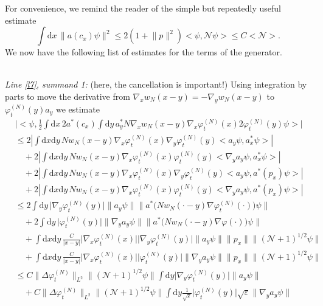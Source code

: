 \documentclass[11pt,a4paper,DIV11]{scrartcl}	%
\newcommand{\di}{\textrm{d}}		%
\newcommand{\Ncal}{\mathcal{N}}		%
\newcommand{\estlist}[2]{\emph{\vspace{.3em}\\Line \ref{l#1}, summand #2:}}
\newcommand{\scal}[2]{\big<#1,#2\big>} %
\newcommand{\norm}[1]{\lVert#1\rVert}	%
\newcommand{\ev}[1]{\big<#1\big>}	%
\newcommand{\ph}{\varphi_t^{(N)}}	%
\newcommand{\bd}{\begin{displaymath}}			%
\newcommand{\ed}{\end{displaymath}}
\begin{document}
For convenience, we remind the reader of the simple but repeatedly useful estimate
\bd
\int \di x\, \norm{a(c_x)\psi}^2 \leq 2(1+\norm{p}^2)\scal{\psi}{\Ncal\psi} \leq C\ev{\Ncal}.
\ed
We now have the following list of estimates for the terms of the generator.\newline
\begin{fleqn}[0.5em]	%
\estlist{7}{1} (here, the cancellation is important!)
Using integration by parts to move the derivative from $\nabla_x w_N(x-y) = - \nabla_y w_N(x-y)$ to $\ph(y) a_y$ we estimate
\begin{align*}
& \lvert \scal{\psi}{\frac{1}{2}\int \di x\, 2a^\ast(c_x) \int \di y\,a^\ast_y N\nabla_x w_N(x-y)\nabla_x \ph(x) 2\ph(y) \psi}\rvert \\
& \leq 2\left\lvert \int \di x \di y\, Nw_N(x-y) \nabla_x \ph(x)  \nabla_y \ph(y) \scal{a_y\psi}{a^\ast_x\psi} \right\rvert \\
& \quad + 2\left\lvert \int \di x \di y\,  Nw_N(x-y) \nabla_x \ph(x) \ph(y)  \scal{\nabla_y a_y\psi}{a^\ast_x \psi} \right\rvert \\
& \quad + 2\left\lvert \int \di x \di y\, Nw_N(x-y) \nabla_x  \ph(x) \nabla_y \ph(y) \scal{a_y \psi}{a^\ast(p_x)\psi} \right\rvert \\
& \quad + 2\left\lvert \int \di x \di y\, Nw_N(x-y) \nabla_x \ph(x) \ph(y) \scal{\nabla_y a_y\psi}{a^\ast(p_x)\psi} \right\rvert \\
&\leq 2\int \di y\,\lvert \nabla_y \ph(y)\rvert \norm{a_y \psi} \norm{a^\ast\big(Nw_N(\cdot -y)\nabla\ph(\cdot)\big)\psi} \\
& \quad + 2\int \di y\,\lvert \ph(y)\rvert \norm{\nabla_y a_y\psi} \norm{a^\ast\big(Nw_N(\cdot-y)\nabla\varphi(\cdot)\big)\psi} \\
& \quad + \int \di x\di y\, \frac{C}{\lvert x-y\rvert} \lvert \nabla_x\ph(x)\rvert \lvert \nabla_y \ph(y)\rvert \norm{a_y \psi} \norm{p_x} \norm{(\Ncal+1)^{1/2}\psi} \\
& \quad + \int \di x\di y\, \frac{C}{\lvert x-y\rvert} \lvert \nabla_x\ph(x)\rvert \lvert \ph(y)\rvert \norm{\nabla_y a_y\psi} \norm{p_x} \norm{(\Ncal+1)^{1/2}\psi} \\
&\leq C \norm{\Delta\ph}_{L^2} \norm{(\Ncal+1)^{1/2}\psi} \int \di y \lvert \nabla_y \ph(y) \rvert \norm{a_y \psi} \\
& \quad + C \norm{\Delta \ph}_{L^2} \norm{(\Ncal+1)^{1/2}\psi} \int \di y \frac{1}{\sqrt{\varepsilon}} \lvert \ph(y)\rvert \sqrt{\varepsilon} \norm{\nabla_y a_y\psi} \\

\end{align*}
\end{fleqn}
\end{document}
